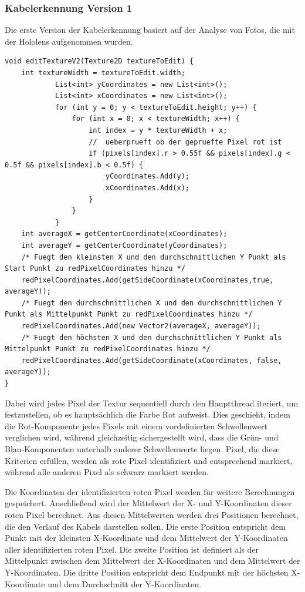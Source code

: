 \begin{itemize}
    \subsubsection{Kabelerkennung Version 1}
    Die erste Version der Kabelerkennung basiert auf der Analyse von Fotos, die mit der Hololens aufgenommen wurden.
    \begin{lstlisting}[style=csharp, caption={Erste Version der Kabel Erkennung}, label=code:debugRaycast]
void editTextureV2(Texture2D textureToEdit) {
    int textureWidth = textureToEdit.width;
            List<int> yCoordinates = new List<int>();
            List<int> xCoordinates = new List<int>();
            for (int y = 0; y < textureToEdit.height; y++) {
                for (int x = 0; x < textureWidth; x++) {
                    int index = y * textureWidth + x;
                    //  ueberprueft ob der gepruefte Pixel rot ist
                    if (pixels[index].r > 0.55f && pixels[index].g < 0.5f && pixels[index].b < 0.5f) {
                        yCoordinates.Add(y);
                        xCoordinates.Add(x);
                    }
                }
            }
    int averageX = getCenterCoordinate(xCoordinates);
    int averageY = getCenterCoordinate(yCoordinates);
    /* Fuegt den kleinsten X und den durchschnittlichen Y Punkt als Start Punkt zu redPixelCoordinates hinzu */
    redPixelCoordinates.Add(getSideCoordinate(xCoordinates,true, averageY));
    /* Fuegt den durchschnittlichen X und den durchschnittlichen Y Punkt als Mittelpunkt Punkt zu redPixelCoordinates hinzu */
    redPixelCoordinates.Add(new Vector2(averageX, averageY));
    /* Fuegt den höchsten X und den durchschnittlichen Y Punkt als Mittelpunkt Punkt zu redPixelCoordinates hinzu */
    redPixelCoordinates.Add(getSideCoordinate(xCoordinates, false, averageY));
}
    \end{lstlisting}
    Dabei wird jedes Pixel der Textur sequentiell durch den Hauptthread iteriert, um festzustellen, ob es hauptsächlich die Farbe Rot aufweist. Dies geschieht, indem die Rot-Komponente jedes Pixels mit einem vordefinierten Schwellenwert verglichen wird, während gleichzeitig sichergestellt wird, dass die Grün- und Blau-Komponenten unterhalb anderer Schwellenwerte liegen. Pixel, die diese Kriterien erfüllen, werden als rote Pixel identifiziert und entsprechend markiert, während alle anderen Pixel als schwarz markiert werden.

    Die Koordinaten der identifizierten roten Pixel werden für weitere Berechnungen gespeichert. Anschließend wird der Mittelwert der X- und Y-Koordinaten dieser roten Pixel berechnet. Aus diesen Mittelwerten werden drei Positionen berechnet, die den Verlauf des Kabels darstellen sollen. Die erste Position entspricht dem Punkt mit der kleinsten X-Koordinate und dem Mittelwert der Y-Koordinaten aller identifizierten roten Pixel. Die zweite Position ist definiert als der Mittelpunkt zwischen dem Mittelwert der X-Koordinaten und dem Mittelwert der Y-Koordinaten. Die dritte Position entspricht dem Endpunkt mit der höchsten X-Koordinate und dem Durchschnitt der Y-Koordinaten.


\end{itemize}
